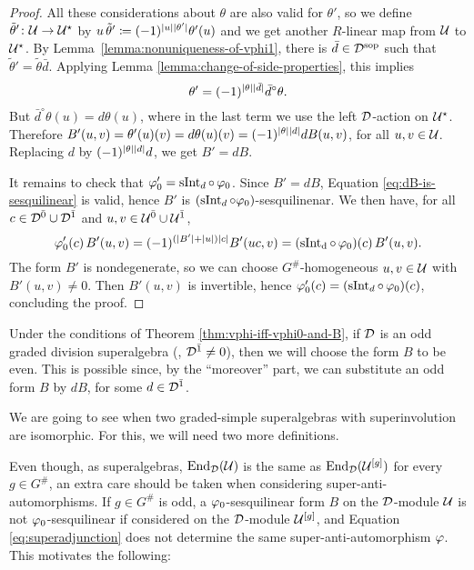 \begin{proof}
    All these considerations about $\theta$ are also valid for $\theta'$, so we define $\tilde\theta'\colon \mathcal U \to \mathcal U^\star$ by $u\,\tilde\theta' \coloneqq (-1)^{|u||\theta'|} \theta'(u)$ and we get another $R$-linear map from $\mathcal U$ to $\mathcal U^\star$.
    By Lemma~\ref{lemma:nonuniqueness-of-vphi1}, there is $\bar d\in \mathcal{D}^{\mathrm{sop}}$ such that $\tilde\theta' = \tilde\theta \bar d$.
    Applying Lemma \ref{lemma:change-of-side-properties}, this implies \[\theta' = (-1)^{|\theta||\bar d|} \bar d^\circ \theta.\]
    But $\bar d^\circ \theta (u) = d\theta(u)$, where in the last term we use the left $\mathcal{D}$-action on $\mathcal U^\star$. 
    Therefore $B'(u,v) = \theta'(u)(v) = d\theta(u)(v) = (-1)^{|\theta||d|} dB(u, v)$, for all $u,v \in \mathcal U$. 
    Replacing $d$ by $(-1)^{|\theta||d|} d$, we get $B' = dB$. 
    
    It remains to check that $\varphi_0' = \operatorname{sInt}_d \circ\, \varphi_0$. 
    Since $B' = dB$, Equation \eqref{eq:dB-is-sesquilinear} is valid, hence $B'$ is $(\operatorname{sInt}_d \circ \varphi_0)$-sesquilinenar.
    We then have, for all $c\in \mathcal{D}^{\bar0} \cup \mathcal{D}^{\bar1}$ and $u,v \in \mathcal U^{\bar0} \cup \mathcal U^{\bar1}$,
    \[
        \varphi_0'(c)\, B'(u,v) = (-1)^{(|B'| + |u|) |c|} B'(uc,v) = (\operatorname{sInt_d} \circ\, \varphi_0) (c)\, B'(u,v).
    \]
    The form $B'$ is nondegenerate, so we can choose $G^\#$-homogeneous $u,v\in \mathcal U$ with $B'(u,v)\neq 0$. Then $B'(u,v)$ is invertible, hence $\varphi_0' (c) = (\operatorname{sInt}_d \circ\, \varphi_0) (c)$, concluding the proof.
\end{proof}

\begin{convention}\label{conv:pick-even-form}
    Under the conditions of Theorem \ref{thm:vphi-iff-vphi0-and-B}, if $\mathcal{D}$ is an odd graded division superalgebra (\ie, $\mathcal{D}^{\bar1} \neq 0$), then we will choose the form $B$ to be even. 
    This is possible since, by the ``moreover'' part, we can substitute an odd form $B$ by $dB$, for some $d\in \mathcal{D}^{\bar1}$.
\end{convention}

We are going to see when two graded-simple superalgebras with superinvolution are isomorphic. 
For this, we will need two more definitions. 

Even though, as superalgebras, $\operatorname{End}_{\mathcal{D}}( \mathcal U )$ is the same as $\operatorname{End}_{\mathcal{D}}( \mathcal U^{[g]} )$ for every $g \in G^\#$, an extra care should be taken when considering super-anti-automorphisms. 
If $g\in G^\#$ is odd, a $\varphi_0$-sesquilinear form $B$ on the $\mathcal{D}$-module $\mathcal U$ is not $\varphi_0$-sesquilinear if considered on the $\mathcal{D}$-module $\mathcal U^{[g]}$, and Equation \eqref{eq:superadjunction} does not determine the same super-anti-automorphism $\varphi$. 
This motivates the following:

